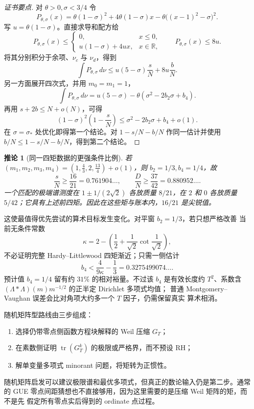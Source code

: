 \documentclass[UTF8,11pt,a4paper]{ctexart}
\newtheorem{corollary}[theorem]{推论}
\theoremstyle{definition}
\theoremstyle{remark}
\newcommand{\tr}{\operatorname{tr}}
\begin{document}
\begin{proof}[证书要点]
对 $\theta>0,\sigma<3/4$ 令
\[
 P_{\theta,\sigma}(x)
 =\theta(1-\sigma)^2+4\theta(1-\sigma)x
 -\theta\big((x-1)^2-\sigma\big)^2.
\]
写 $u=\theta(1-\sigma)$。直接求导和配方给
\[
 P_{\theta,\sigma}(x)\le
 \begin{cases}
 0,&x\le0,\\
 u(1-\sigma)+4ux,&x\in\mathbb R,
 \end{cases}
 \qquad
 P_{\theta,\sigma}(x)\le8u.
\]
将其分别积分于余项、$\nu_c$ 与 $\nu_d$，得到
\[
 \int P_{\theta,\sigma}\,d\nu
 \le u(5-\sigma)\frac{s}{N}+8u\frac{b}{N}.
\]
另一方面展开四次式，并用 $m_0=m_1=1$，
\[
 \int P_{\theta,\sigma}\,d\nu
 =u(5-\sigma)-\theta(\sigma^2-2b_2\sigma+b_4).
\]
再用 $s+2b\le N+o(N)$，可得
\[
 (1-\sigma)^2\left(1-\frac{s}{N}\right)
 \le\sigma^2-2b_2\sigma+b_4+o(1).
\]
在 $\sigma=\sigma_*$ 处优化即得第一个结论。对
$1-s/N-b/N$ 作同一估计并使用 $b/N\le1-s/N-b/N$，得到第二个结论。
\end{proof}

\begin{corollary}[同一四矩数据的更强条件比例]
若
$(m_1,m_2,m_3,m_4)=(1,\frac43,2,\frac{13}{4})+o(1)$，则
$b_2=1/3,b_4=1/4$，故
\[
 \frac{s}{N}\ge\frac{16}{21}=0.761904\ldots,\qquad
 \frac{D}{N}\ge\frac{37}{42}=0.880952\ldots.
\]
一个匹配的极端谱测度在
$1\pm1/(2\sqrt2)$ 各放质量 $8/21$，在 $2$ 和 $0$ 各放质量
$5/42$；它具有上述前四矩。因此在这些矩与账本内，$16/21$ 是尖锐值。
\end{corollary}

这使最值得优先尝试的算术目标发生变化。对平窗 $b_2=1/3$，若只想严格改善
当前无条件常数
\[
 \kappa=2-\left(\frac12+\frac1{\sqrt2}\cot\frac1{\sqrt2}\right),
\]
不必证明完整 Hardy--Littlewood 四矩渐近；只需一侧估计
\[
 b_4<\frac4{9\kappa}-\frac13
 =0.3275499074\ldots.
\]
预计值 $b_4=1/4$ 留有约 $31\%$ 的相对裕量。不过该 $b_4$ 是有效长度约
$T^2$、系数含 $(\Lambda*\Lambda)(m)m^{-1/2}$ 的正半定 Dirichlet 多项式均值；
普通 Montgomery--Vaughan 误差会比对角项大约多一个 $T$ 因子，仍需保留真实
算术相消。

随机矩阵型路线由三步组成：
\begin{enumerate}
\item 选择仍带零点侧函数方程块解释的 Weil 压缩 $G_T$；
\item 在素数侧证明 $\tr(G_T^k)$ 的极限或严格界，而不预设 RH；
\item 解单变量多项式 minorant 问题，将矩转为正惯性。
\end{enumerate}
随机矩阵启发可以建议极限谱和最优多项式，但真正的数论输入仍是第二步。通常的
GUE 零点间距猜想也不直接够用，因为这里需要的是压缩 Weil 矩阵的矩，而不是先
假定所有零点实后得到的 ordinate 点过程。
\end{document}
